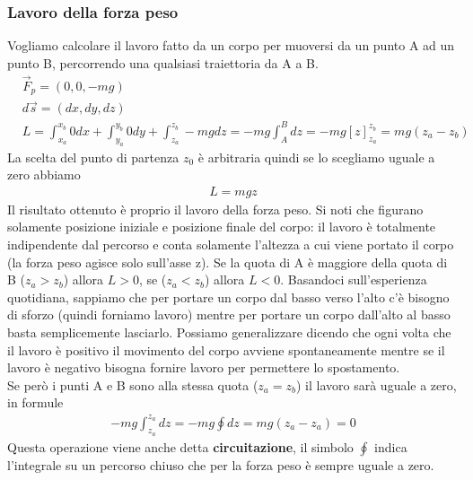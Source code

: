 \subsubsection{Lavoro della forza peso}
Vogliamo calcolare il lavoro fatto da un corpo per muoversi da un punto A ad un punto B, percorrendo una qualsiasi traiettoria da A a B.
\begin{align*}
&\vec{F}_p = (0,0,-mg)\\
&d\vec{s} = (dx,dy,dz)\\
&L = \int_{x_a}^{x_b} 0 dx+\int_{y_a}^{y_b} 0 dy+\int_{z_a}^{z_b} -mg dz = -mg \int_{A}^{B} dz = -mg[z]_{z_a}^{z_b}= mg(z_a-z_b)
\end{align*}
La scelta del punto di partenza $z_0$ è arbitraria quindi se lo scegliamo uguale a zero abbiamo
\begin{align*}
	L = mgz
\end{align*}
Il risultato ottenuto è proprio il lavoro della forza peso. Si noti che figurano solamente posizione iniziale e posizione finale del corpo: il lavoro è totalmente indipendente dal percorso e conta solamente l'altezza a cui viene portato il corpo (la forza peso agisce solo sull'asse z). Se la quota di A è maggiore della quota di B ($z_a>z_b$) allora $L>0$, se ($z_a<z_b$) allora $L<0$. Basandoci sull'esperienza quotidiana, sappiamo che per portare un corpo dal basso verso l'alto c'è bisogno di sforzo (quindi forniamo lavoro) mentre per portare un corpo dall'alto al basso basta semplicemente lasciarlo. Possiamo generalizzare dicendo che ogni volta che il lavoro è positivo il movimento del corpo avviene spontaneamente mentre se il lavoro è negativo bisogna fornire lavoro per permettere lo spostamento.\\
Se però i punti A e B sono alla stessa quota ($z_a=z_b$) il lavoro sarà uguale a zero, in formule
\begin{align*}
-mg \int_{z_a}^{z_a} dz = -mg \oint dz = mg(z_a-z_a)= 0 
\end{align*}
Questa operazione viene anche detta \textbf{circuitazione}, il simbolo $\oint$ indica l'integrale su un percorso chiuso che per la forza peso è sempre uguale a zero. 
